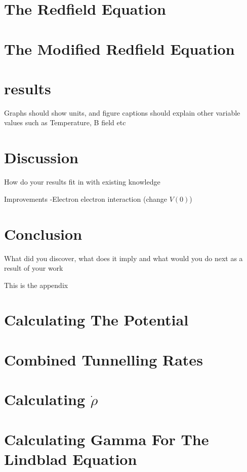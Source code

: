 \documentclass{article}
\begin{document}
\section{The Redfield Equation}


\section{The Modified Redfield Equation}



\section{results}
Graphs should show units, and figure captions should explain other variable values such as Temperature, B
field etc

\section{Discussion}
How do your results fit in with existing knowledge

Improvements
-Electron electron interaction (change \(V(0)\))


\section{Conclusion}
What did you discover, what does it imply and what would you do next as a result of your work

\printbibliography{}

\begin{appendix}
    This is the appendix
    \section{Calculating The Potential}\label{app:interaction potential calculation}
    

    \section{Combined Tunnelling Rates}\label{app:combined tunnelling rates}
    

    \section{Calculating \(\dot{\rho}\)}
    

    \section{Calculating Gamma For The Lindblad Equation}
    


\end{appendix}
\end{document}

